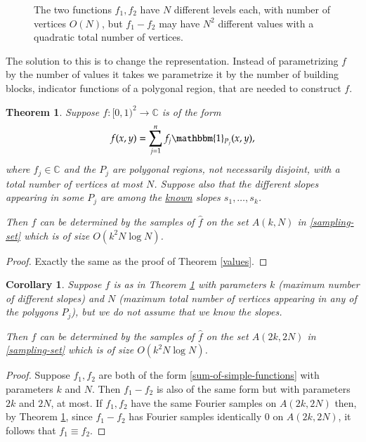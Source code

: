 \documentclass[12pt,a4paper,oneside]{amsart}
\newtheorem{theorem}{Theorem}[section]
\newtheorem{corollary}{Corollary}[section]
\theoremstyle{definition}
\newcommand{\CC}{{\mathbb C}}
\newcommand{\one}{{\mathbbm{1}}}
\newcommand{\ft}[1]{\widehat{#1}}
\newcounter{rem}
\begin{document}
\begin{figure}[h]
 
 \caption{The two functions $f_1, f_2$ have $N$ different levels each, with number of vertices $O(N)$, but $f_1-f_2$ may have $N^2$ different values with a quadratic total number of vertices.}\label{fig:crossings}
\end{figure}

The solution to this is to change the representation. Instead of parametrizing $f$ by the number of values it takes we parametrize it by the number of building blocks, indicator functions of a polygonal region, that are needed to construct $f$.
\begin{theorem}\label{th:sum-of-simple-functions}
Suppose $f:[0, 1)^2\to\CC$ is of the form
\begin{equation}\label{sum-of-simple-functions}
f(x, y) = \sum_{j=1}^n f_j \one_{P_j}(x, y),
\end{equation}
where $f_j \in \CC$ and the $P_j$ are polygonal regions, not necessarily disjoint, with a total number of vertices at most $N$. Suppose also that the different slopes appearing in some $P_j$ are among the \underline{known} slopes $s_1, \ldots, s_k$.

Then $f$ can be determined by the samples of $\ft{f}$ on the set $A(k, N)$ in \eqref{sampling-set} which is of size $O(k^2 N \log N)$.
\end{theorem}

\begin{proof}
Exactly the same as the proof of Theorem \ref{values}.

\end{proof}

\begin{corollary}\label{cor:unkown-slopes}
Suppose $f$ is as in Theorem \ref{th:sum-of-simple-functions} with parameters $k$ (maximum number of different slopes) and $N$ (maximum total number of vertices appearing in any of the polygons $P_j$), but we do not assume that we know the slopes.

Then $f$ can be determined by the samples of $\ft{f}$ on the set $A(2k, 2N)$ in \eqref{sampling-set} which is of size $O(k^2 N \log N)$.
\end{corollary}

\begin{proof}
Suppose $f_1, f_2$ are both of the form \eqref{sum-of-simple-functions} with parameters $k$ and $N$. Then $f_1-f_2$ is also of the same form but with parameters $2k$ and $2N$, at most. If $f_1, f_2$ have the same Fourier samples on $A(2k, 2N)$ then, by Theorem \ref{th:sum-of-simple-functions}, since $f_1-f_2$ has Fourier samples identically 0 on $A(2k, 2N)$, it follows that $f_1 \equiv f_2$.

\end{proof}
\end{document}
